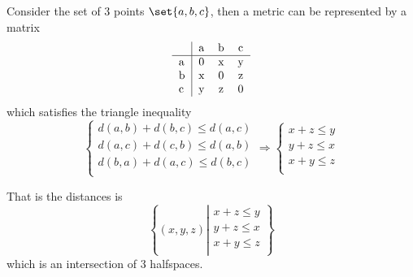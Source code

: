 Consider the set of $3$ points $\set{a, b, c}$, then a metric can be
represented by a matrix
\begin{equation}
    \begin{tabular}{l|*{3}c}
          & a & b & c\\
        \hline
        a & 0 & x & y\\
        b & x & 0 & z\\
        c & y & z & 0\\
    \end{tabular}
\end{equation}
which satisfies the triangle inequality
\begin{equation}
    \begin{cases}
        d(a, b) + d(b, c) \le d(a, c)\\
        d(a, c) + d(c, b) \le d(a, b)\\
        d(b, a) + d(a, c) \le d(b, c)\\
    \end{cases}\Rightarrow
    \begin{cases}
        x + z \le y\\
        y + z \le x\\
        x + y \le z\\
    \end{cases}
\end{equation}

That is the distances is
\begin{equation}
    \left\{ %
        (x, y, z)
    \left|
        \begin{split}
            x + z \le y\\
            y + z \le x\\
            x + y \le z\\
        \end{split}
    \right.\right\}
\end{equation}
which is an intersection of $3$ halfspaces.




